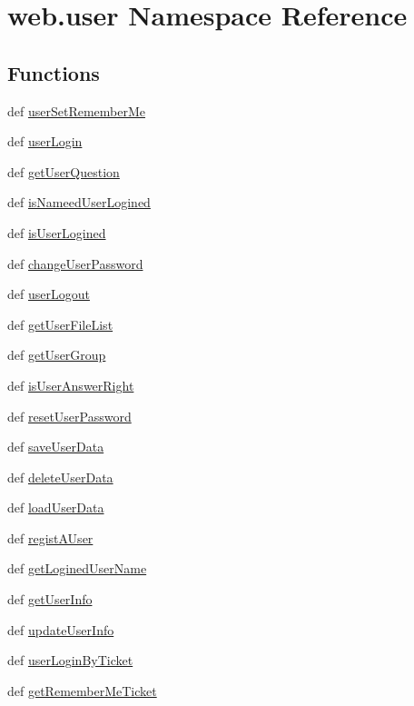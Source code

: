 \hypertarget{namespaceweb_1_1user}{\section{web.\-user Namespace Reference}
\label{namespaceweb_1_1user}
}
\subsection*{Functions}
\begin{DoxyCompactItemize}
\item 
def \hyperlink{namespaceweb_1_1user_abc5c01a718c5fbe455f9e3d7e4a1be8c}{user\-Set\-Remember\-Me}
\item 
def \hyperlink{namespaceweb_1_1user_a18010cc8915fb5842636d8db4774d041}{user\-Login}
\item 
def \hyperlink{namespaceweb_1_1user_ad9a3fcd158779b725194a3ff92b171e6}{get\-User\-Question}
\item 
def \hyperlink{namespaceweb_1_1user_af5687cf4f00354107c94a03eac017496}{is\-Nameed\-User\-Logined}
\item 
def \hyperlink{namespaceweb_1_1user_a38fcd46ce0e5fd094569f50175317c30}{is\-User\-Logined}
\item 
def \hyperlink{namespaceweb_1_1user_a1e8cb3da4ff08ce9aa68c24c79dcc4d4}{change\-User\-Password}
\item 
def \hyperlink{namespaceweb_1_1user_a426bfbbae764bd023f6fee52a3782535}{user\-Logout}
\item 
def \hyperlink{namespaceweb_1_1user_aa0ff67d8d0604dab33c58f9c34104c47}{get\-User\-File\-List}
\item 
def \hyperlink{namespaceweb_1_1user_a0c638af1e9b3e433edcd3ba5a2a905cb}{get\-User\-Group}
\item 
def \hyperlink{namespaceweb_1_1user_a423926853a44513dcedce2ecd8b612e0}{is\-User\-Answer\-Right}
\item 
def \hyperlink{namespaceweb_1_1user_aaab11f1324b2c958c63a3d4005ef8f36}{reset\-User\-Password}
\item 
def \hyperlink{namespaceweb_1_1user_a555ab9b03ddbc9cc599fd63864c5c32d}{save\-User\-Data}
\item 
def \hyperlink{namespaceweb_1_1user_a0c395ddf8c1d656ecbc98924132f3050}{delete\-User\-Data}
\item 
def \hyperlink{namespaceweb_1_1user_a9808fe9440f0f5629ca4a9badd9f7dc4}{load\-User\-Data}
\item 
def \hyperlink{namespaceweb_1_1user_a5070623b7ad189135704bb2f74baa86f}{regist\-A\-User}
\item 
def \hyperlink{namespaceweb_1_1user_af99f5873e49733c43b08e012fa415830}{get\-Logined\-User\-Name}
\item 
def \hyperlink{namespaceweb_1_1user_a05d65592ef23fa49cfe5981572dc4d2e}{get\-User\-Info}
\item 
def \hyperlink{namespaceweb_1_1user_a4a012ea4ff6e4f93a108fc142c10009a}{update\-User\-Info}
\item 
def \hyperlink{namespaceweb_1_1user_a9f722c8fc6cc29639f97401ff43ae52b}{user\-Login\-By\-Ticket}
\item 
def \hyperlink{namespaceweb_1_1user_acd9378ec2190f99ba7c702db8fd5680c}{get\-Remember\-Me\-Ticket}
\end{DoxyCompactItemize}

